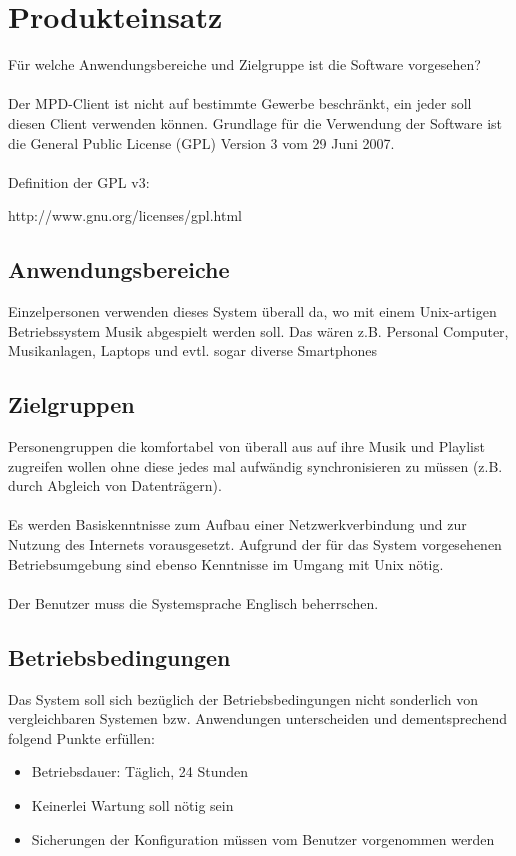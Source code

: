 \section{Produkteinsatz}
Für welche Anwendungsbereiche und Zielgruppe ist die Software vorgesehen?\ \\ \\
Der MPD-Client ist nicht auf bestimmte Gewerbe beschränkt, ein jeder soll diesen
Client verwenden können. Grundlage für die Verwendung der Software ist die General
Public License (GPL) Version 3 vom 29 Juni 2007.\ \\ \\
Definition der GPL v3:
\begin{center}
	http://www.gnu.org/licenses/gpl.html
\end{center}
\subsection{Anwendungsbereiche}
Einzelpersonen verwenden dieses System überall da, wo mit
einem Unix-artigen Betriebssystem Musik abgespielt werden soll.
Das wären z.B. Personal Computer, Musikanlagen, Laptops und evtl.
sogar diverse Smartphones
\subsection{Zielgruppen}
Personengruppen die komfortabel von überall aus auf ihre Musik und Playlist zugreifen
wollen ohne diese jedes mal aufwändig synchronisieren zu müssen (z.B. durch Abgleich von Datenträgern).\ \\ \\
Es werden Basiskenntnisse zum Aufbau einer Netzwerkverbindung und zur Nutzung des Internets vorausgesetzt.
Aufgrund der für das System vorgesehenen Betriebsumgebung sind ebenso Kenntnisse im Umgang mit Unix nötig.\ \\ \\
Der Benutzer muss die Systemsprache Englisch beherrschen.
\subsection{Betriebsbedingungen}
Das System soll sich bezüglich der Betriebsbedingungen nicht sonderlich von vergleichbaren Systemen bzw.
Anwendungen unterscheiden und dementsprechend folgend Punkte erfüllen:
\begin{itemize}
        \item Betriebsdauer: Täglich, 24 Stunden
        \item Keinerlei Wartung soll nötig sein
        \item Sicherungen der Konfiguration müssen vom Benutzer vorgenommen werden
\end{itemize}
